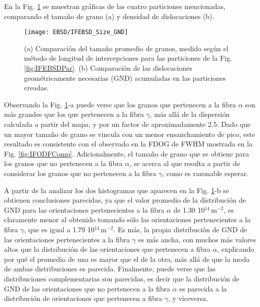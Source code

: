 En la Fig. \ref{fig:IFEBSDVs} se muestran gráficas de las cuatro particiones mencionadas, comparando el tamaño de grano (a) y densidad de dislocaciones (b).

\begin{figure}[!htb]
  \centering
  \texttt{[image: EBSD/IFEBSD\_Size\_GND]}
  \caption{(a) Comparación del tamaño promedio de granos, medido según el método de longitud de intercepciones para las particiones de la Fig. \ref{fig:IFEBSDPar}. (b) Comparación de las dislocaciones geométricamente necesarias (GND) acumuladas en las particiones creadas.}
  \label{fig:IFEBSDVs}
\end{figure}

Observando la Fig. \ref{fig:IFEBSDVs}-a puede verse que los granos que pertenecen a la fibra $\alpha$ son más grandes que los que pertenecen a la fibra $\gamma$, más allá de la dispersión calculada a partir del mapa, y por un factor de aproximadamente 2.5.
Dado que un mayor tamaño de grano se vincula con un menor ensanchamiento de pico, este resultado es consistente con el observado en la FDOG de FWHM mostrada en la Fig. \ref{fig:IFODFComp}.
Adicionalmente, el tamaño de grano que se obtiene para los granos que no pertenecen a la fibra $\alpha$, se acerca al que resulta a partir de considerar los granos que no pertenecen a la fibra $\gamma$, como es razonable esperar.

A partir de la analizar los dos histogramas que aparecen en la Fig. \ref{fig:IFEBSDVs}-b se obtienen conclusiones parecidas, ya que el valor promedio de la distribución de GND para las orientaciones pertenecientes a la fibra $\alpha$ de 1.30 10$^{14}$\,m$^{-2}$, es claramente menor al obtenido tomando sólo las orientaciones pertenecientes a la fibra $\gamma$, que es igual a 1.79 10$^{14}$\,m$^{-2}$.
Es más, la propia distribución de GND de las orientaciones pertenecientes a la fibra $\gamma$ es más ancha, con muchos más valores altos que la distribución de las orientaciones que pertenecen a fibra $\alpha$, explicando por qué el promedio de una es mayor que el de la otra, más allá de que la moda de ambas distribuciones es parecida.
Finalmente, puede verse que las distribuciones complementarias son parecidas, es decir que la distribución de GND de las orientaciones que no pertenecen a la fibra $\alpha$ es parecida a la distribución de orientaciones que pertenecen a fibra $\gamma$, y viceversa.

